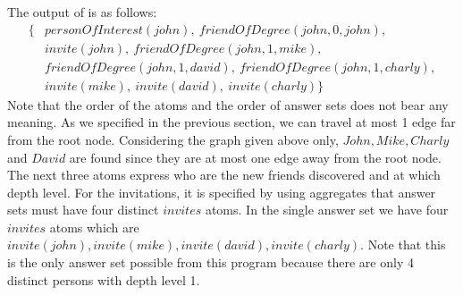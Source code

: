 \documentclass[a4paper, titlepage]{article}
\begin{document}
The output of \dlvhex{} is as follows:
\begin{align*}
   \{ &\mathit{personOfInterest(john), \ friendOfDegree(john,0,john), }\\
      &\mathit{invite(john), \ friendOfDegree(john,1,mike),}\\ 
      & \mathit{friendOfDegree(john,1,david), \ friendOfDegree(john,1,charly),} \\
      & \mathit{invite(mike), \ invite(david), \ invite(charly)}
       \}
 \end{align*}
Note that the order of the atoms and the order of answer sets 
does not bear any meaning. As we specified in the previous 
section, we can travel at most 1 edge far from the root 
node. Considering the graph given above only, $\mathit{John, 
Mike, Charly}$ and $\mathit{David}$ are found since they 
are at most one edge away from the root node. The next three atoms 
express who are the new friends discovered and at which 
depth 
level. For the invitations, it is specified by using 
aggregates that answer sets must have four distinct 
$\mathit{invites}$ atoms.
In the single answer set we have four $\mathit{invites}$ atoms 
which are $\mathit{invite(john), 
invite(mike), invite(david), invite(charly)}$. Note that 
this is the only answer set possible 
from this program because
there are only 4 distinct persons with depth level 1. 
\end{document}
